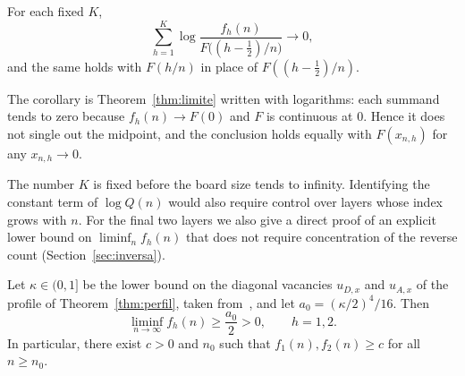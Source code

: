 \begin{corolario}\label{cor:capas} For each fixed $K$, \[
 \sum_{h=1}^K\log\frac{f_h(n)}{F\bigl((h-\tfrac12)/n\bigr)}\longrightarrow0,
\] and the same holds with $F(h/n)$ in place of $F((h-\tfrac12)/n)$. \end{corolario}

The corollary is Theorem~\ref{thm:limite} written with logarithms: each summand tends to zero because
$f_h(n)\to F(0)$ and $F$ is
continuous at $0$. Hence it does not single out the midpoint, and the conclusion holds equally with
$F(x_{n,h})$ for any
$x_{n,h}\to0$.

The number $K$ is fixed before the board size tends to infinity. Identifying the constant term of
$\log Q(n)$ would also require
control over layers whose index grows with $n$. For the final two layers we also give a direct proof of an
explicit lower bound on
$\liminf_nf_h(n)$ that does not require concentration of the reverse count (Section~\ref{sec:inversa}).

\begin{teorema}\label{thm:positiva} Let $\kappa\in(0,1]$ be the lower
bound on the diagonal
vacancies $u_{D,x}$ and $u_{A,x}$ of the profile of Theorem~\ref{thm:perfil}, taken from~\cite{Perfil}, and
let
$a_0=(\kappa/2)^4/16$. Then \[
 \liminf_{n\to\infty}f_h(n)\ge\frac{a_0}{2}>0,\qquad h=1,2.
\] In particular, there exist $c>0$ and $n_0$ such that $f_1(n),f_2(n)\ge c$ for all $n\ge n_0$.
\end{teorema}
